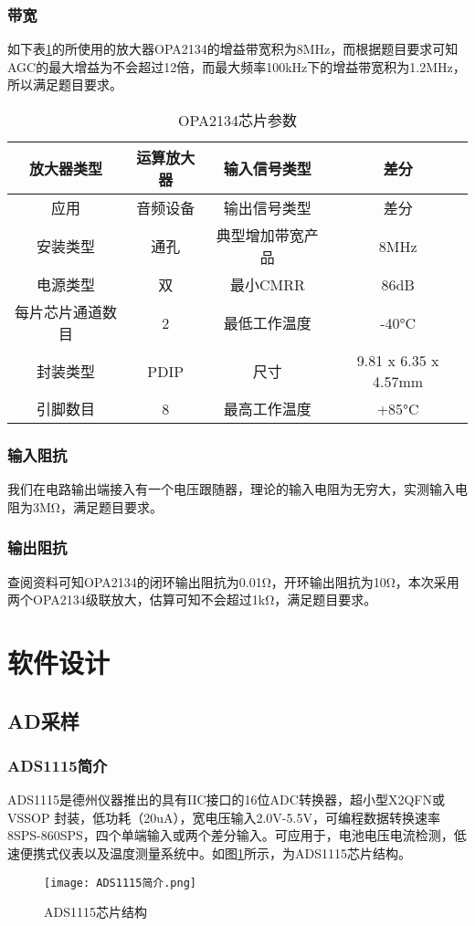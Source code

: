 \documentclass[lang=cn,11pt,a4paper]{elegantpaper}
\begin{document}
\subsubsection{带宽}
如下表\ref{tab:OPA2134}的所使用的放大器OPA2134的增益带宽积为8MHz，而根据题目要求可知AGC的最大增益为不会超过12倍，而最大频率100kHz下的增益带宽积为1.2MHz，所以满足题目要求。
\begin{table}[!ht]
  \centering
  \caption{OPA2134芯片参数}
  \begin{tabular}{|c|c|c|c|}
    \hline
    放大器类型    & 运算放大器 & 输入信号类型   & 差分                   \\ \hline
    应用       & 音频设备  & 输出信号类型   & 差分                   \\ \hline
    安装类型     & 通孔    & 典型增加带宽产品 & 8MHz                 \\ \hline
    电源类型     & 双     & 最小CMRR   & 86dB                 \\ \hline
    每片芯片通道数目 & 2     & 最低工作温度   & -40°C                \\ \hline
    封装类型     & PDIP  & 尺寸       & 9.81 x 6.35 x 4.57mm \\ \hline
    引脚数目     & 8     & 最高工作温度   & +85°C                \\ \hline
  \end{tabular}
  \label{tab:OPA2134}
\end{table}

\subsubsection{输入阻抗}
我们在电路输出端接入有一个电压跟随器，理论的输入电阻为无穷大，实测输入电阻为3MΩ，满足题目要求。


\subsubsection{输出阻抗}
查阅资料可知OPA2134的闭环输出阻抗为0.01Ω，开环输出阻抗为10Ω，本次采用两个OPA2134级联放大，估算可知不会超过1kΩ，满足题目要求。


\section{软件设计}

\subsection{AD采样}
\subsubsection{ADS1115简介}
ADS1115是德州仪器推出的具有IIC接口的16位ADC转换器，超小型X2QFN或VSSOP 封装，低功耗（20uA），宽电压输入2.0V-5.5V，可编程数据转换速率8SPS-860SPS，四个单端输入或两个差分输入。可应用于，电池电压电流检测，低速便携式仪表以及温度测量系统中。如图\ref{fig:ADS1115芯片结构}所示，为ADS1115芯片结构。
\begin{figure}[!htb]
  \centering
  \texttt{[image: ADS1115简介.png]}
  \caption{ADS1115芯片结构}
  \label{fig:ADS1115芯片结构}
\end{figure}
\end{document}
